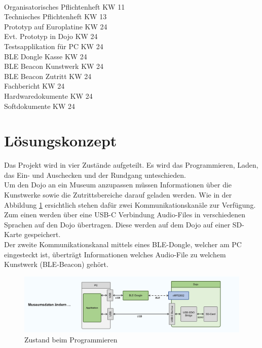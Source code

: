 \documentclass[10pt,a4paper,oneside]{99_fhnwreport}
\begin{document}
\begin{tabbing}
\hspace{80mm}		\= 	\\ %
Organisatorisches Pflichtenheft		\>	KW 11 \\
Technisches Pflichtenheft		\>	KW 13 \\
Prototyp auf Europlatine		\>	KW 24 \\
Evt. Prototyp in Dojo			\>	KW 24 \\
Testsapplikation für PC			\>	KW 24 \\
BLE Dongle Kasse			\>	KW 24 \\
BLE Beacon Kunstwerk			\>	KW 24 \\
BLE Beacon Zutritt			\>	KW 24 \\
Fachbericht				\>	KW 24 \\
Hardwaredokumente			\>	KW 24 \\
Softdokumente				\>	KW 24 \\
\end{tabbing}

\section{Lösungskonzept}\label{sec:konzept}
Das Projekt wird in vier Zustände aufgeteilt. Es wird das Programmieren, Laden, das Ein- und Auschecken und der Rundgang unteschieden.\\
Um den Dojo an ein Museum anzupassen müssen Informationen über die Kunstwerke sowie die Zutrittsbereiche darauf geladen werden. Wie in der Abbildung \ref{fig:image3} ersichtlich stehen dafür zwei Kommunikationskanäle zur Verfügung. Zum einen werden über eine USB-C Verbindung Audio-Files in verschiedenen Sprachen auf den Dojo übertragen. Diese werden auf dem Dojo auf einer SD-Karte gespeichert.\\
Der zweite Kommunikationskanal mittels eines BLE-Dongle, welcher am PC eingesteckt ist, überträgt Informationen welches Audio-File zu welchem Kunstwerk (BLE-Beacon) gehört.

\begin{figure}[htb]
\includegraphics[width=\textwidth]{Zustand_Programmieren.png}
\caption{Zustand beim Programmieren} %
\label{fig:image3}
\end{figure}
\end{document}
